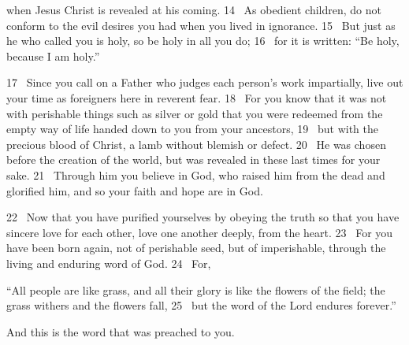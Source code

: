 when Jesus Christ is revealed at his coming.
14  As obedient
children, do not conform
to the evil desires you had when you lived in ignorance.
15  But just as he who called you is holy, so be holy in all you do;
16  for it is written: “Be holy, because I am holy.”
\par
17  Since you call on a Father
who judges each person’s work
impartially,
live out your time as foreigners
here in reverent fear.
18  For you know that it was not with perishable things such as silver or gold that you were redeemed
from the empty way of life
handed down to you from your ancestors,
19  but with the precious blood
of Christ, a lamb
without blemish or defect.
20  He was chosen before the creation of the world,
but was revealed in these last times
for your sake.
21  Through him you believe in God,
who raised him from the dead
and glorified him,
and so your faith and hope
are in God.
\par
22  Now that you have purified
yourselves by obeying
the truth so that you have sincere love for each other, love one another deeply,
from the heart.
23  For you have been born again,
not of perishable seed, but of imperishable,
through the living and enduring word of God.
24  For,
\par
“All people are like grass,
and all their glory is like the flowers of the field;
the grass withers and the flowers fall,
25 
but the word of the Lord endures forever.”
\par
And this is the word that was preached to you.


\bye

